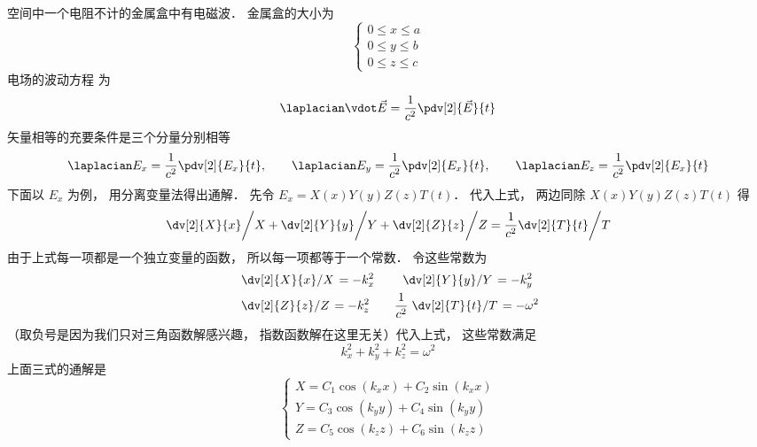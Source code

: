 
空间中一个电阻不计的金属盒中有电磁波．
金属盒的大小为 
\begin{equation}
\left\{ \begin{array}{l}
0 \le x \le a\\
0 \le y \le b\\
0 \le z \le c
\end{array} \right.
\end{equation} 
电场的波动方程%
为
\begin{equation}
{\laplacian} \vdot \vec E = \frac{1}{{{c^2}}} \pdv[2]{\vec E}{t}
\end{equation}  
矢量相等的充要条件是三个分量分别相等
\begin{equation}
{\laplacian}{E_x} = \frac{1}{{{c^2}}} \pdv[2]{E_x}{t},
\qquad
{\laplacian}{E_y} = \frac{1}{{{c^2}}} \pdv[2]{E_x}{t},
\qquad
{\laplacian}{E_z} = \frac{1}{{{c^2}}} \pdv[2]{E_x}{t}
\end{equation}   
下面以 $E_x$ 为例， 用分离变量法得出通解．
先令 ${E_x} = X\left( x \right)Y\left( y \right)Z\left( z \right)T\left( t \right)$． 代入上式， 两边同除 $X\left( x \right)Y\left( y \right)Z\left( z \right)T\left( t \right)$ 得
\begin{equation}
\left. \dv[2]{X}{x} \middle/ X + \dv[2]{Y}{y} \middle/ Y + \dv[2]{Z}{z} \middle/ Z  = \frac{1}{c^2}  \dv[2]{T}{t} \middle/ T\right.
\end{equation}
由于上式每一项都是一个独立变量的函数， 所以每一项都等于一个常数． 令这些常数为
\begin{equation}\begin{aligned}
&\left. \dv[2]{X}{x} \middle/ X \right. = -k_x^2
\qquad
\left. \dv[2]{Y}{y} \middle/ Y \right. = -k_y^2\\
&\left. \dv[2]{Z}{z} \middle/ Z \right. = -k_z^2
\qquad
\frac{1}{c^2} \left. \dv[2]{T}{t} \middle/ T \right. = -\omega^2
\end{aligned}\end{equation}
（取负号是因为我们只对三角函数解感兴趣， 指数函数解在这里无关）代入上式， 这些常数满足
\begin{equation}
k_x^2 + k_y^2 + k_z^2 = {\omega ^2}
\end{equation} 
上面三式的通解是
\begin{equation}
\left\{ \begin{array}{l}
X = {C_1}\cos \left( {{k_x}x} \right) + {C_2}\sin \left( {{k_x}x} \right)\\
Y = {C_3}\cos \left( {{k_y}y} \right) + {C_4}\sin \left( {{k_y}y} \right)\\
Z = {C_5}\cos \left( {{k_z}z} \right) + {C_6}\sin \left( {{k_z}z} \right)
\end{array} \right.
\end{equation} 

